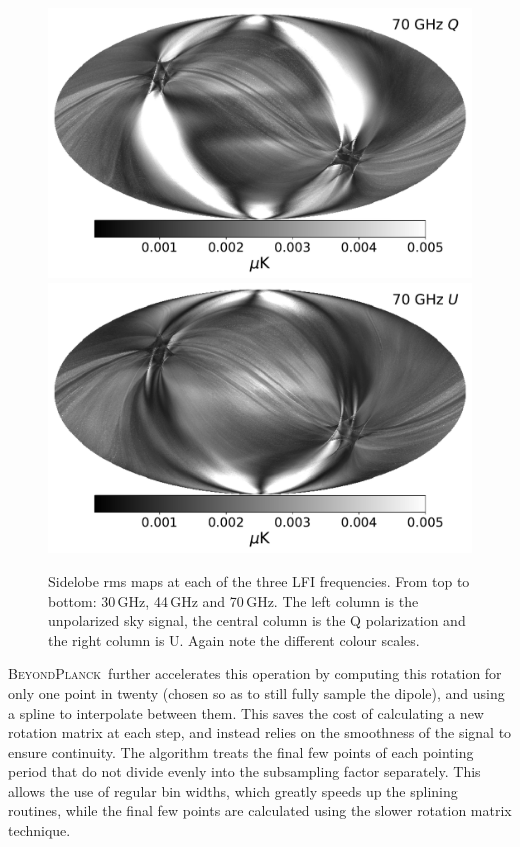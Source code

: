 \documentclass[twocolumn]{aa}
\newcommand{\BP}{\textsc{BeyondPlanck}}
\begin{document}
\begin{figure}[t]
  \includegraphics[width=0.33\linewidth]{scripts/070_Q_sl_rms.pdf}
  \includegraphics[width=0.33\linewidth]{scripts/070_U_sl_rms.pdf}\\
  \caption{Sidelobe rms maps at each of the three LFI frequencies. From top to bottom: 30\,GHz, 44\,GHz and 70\,GHz. The left column is the unpolarized sky signal, the central column is the Q polarization and the right column is U. Again note the different colour scales.
  }\label{fig:slrms}
\end{figure}

\BP\ further accelerates this operation by computing this rotation for only one point in twenty (chosen so as to still fully sample the dipole), and using a spline to interpolate between them. This saves the cost of calculating a new rotation matrix at each step, and instead relies on the smoothness of the signal to ensure continuity. The algorithm treats the final few points of each pointing period that do not divide evenly into the subsampling factor separately. This allows the use of regular bin widths, which greatly speeds up the splining routines, while the final few points are calculated using the slower rotation matrix technique. 
\end{document}
